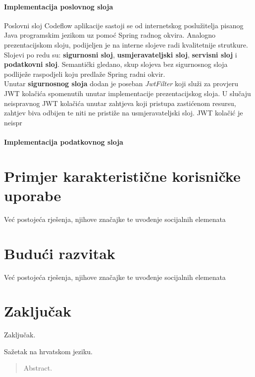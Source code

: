 \documentclass[times, utf8, zavrsni]{fer}
\begin{document}
	 		\subsubsection{Implementacija poslovnog sloja}
	 		Poslovni sloj Codeflow aplikacije sastoji se od internetskog poslužitelja pisanog Java programskim jezikom uz pomoć Spring radnog okvira. Analogno prezentacijskom sloju, podijeljen je na interne slojeve radi kvalitetnije strutkure. Slojevi po redu su: \textbf{sigurnosni sloj}, \textbf{usmjeravateljski sloj}, \textbf{servisni sloj} i \textbf{podatkovni sloj}. Semantički gledano, skup slojeva bez sigurnosnog sloja podliježe raspodjeli koju predlaže Spring radni okvir.\\
	 		Unutar \textbf{sigurnosnog sloja} dodan je poseban \textit{JwtFilter} koji služi za provjeru JWT kolačića spomenutih unutar implementacije prezentacijskog sloja. U slučaju neispravnog JWT kolačića unutar zahtjeva koji pristupa zastićenom resursu, zahtjev biva odbijen te niti ne pristiže na usmjeravateljski sloj. JWT kolačić je neispr
			
			\subsubsection{Implementacija podatkovnog sloja}
	
	\chapter{Primjer karakteristične korisničke uporabe}
	Već postojeća rješenja, njihove značajke te uvođenje socijalnih elemenata
	
	\chapter{Budući razvitak}
	Već postojeća rješenja, njihove značajke te uvođenje socijalnih elemenata
	
	\chapter{Zaključak}
	Zaključak.
	
	\nocite{react2021}
	\nocite{react-router2021}
	\nocite{bootstrap2021}
	\nocite{materialUI2021}
	\nocite{ace2021}
	\nocite{spring2021}
	\nocite{hibernate2021}
	\nocite{springsecurity2021}
	\nocite{springdatajpa2021}
	\nocite{axios2021}
	\nocite{git2021}
	\nocite{postgresql2021}
	
	
	
	\begin{sazetak}
		Sažetak na hrvatskom jeziku.
		
	\end{sazetak}
	
	\begin{abstract}
		Abstract.
		
	\end{abstract}
	
\end{document}

